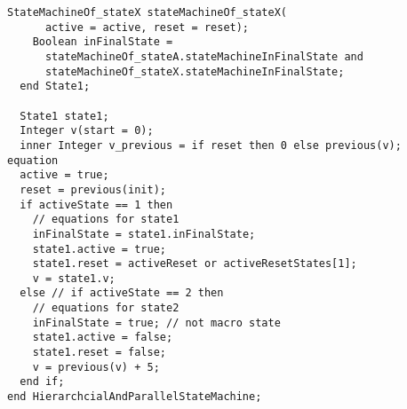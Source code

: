 \begin{example}
\begin{lstlisting}[language=modelica]
    StateMachineOf_stateX stateMachineOf_stateX(
      active = active, reset = reset);
    Boolean inFinalState =
      stateMachineOf_stateA.stateMachineInFinalState and
      stateMachineOf_stateX.stateMachineInFinalState;
  end State1;

  State1 state1;
  Integer v(start = 0);
  inner Integer v_previous = if reset then 0 else previous(v);
equation
  active = true;
  reset = previous(init);
  if activeState == 1 then
    // equations for state1
    inFinalState = state1.inFinalState;
    state1.active = true;
    state1.reset = activeReset or activeResetStates[1];
    v = state1.v;
  else // if activeState == 2 then
    // equations for state2
    inFinalState = true; // not macro state
    state1.active = false;
    state1.reset = false;
    v = previous(v) + 5;
  end if;
end HierarchcialAndParallelStateMachine;
\end{lstlisting}
\end{example}
